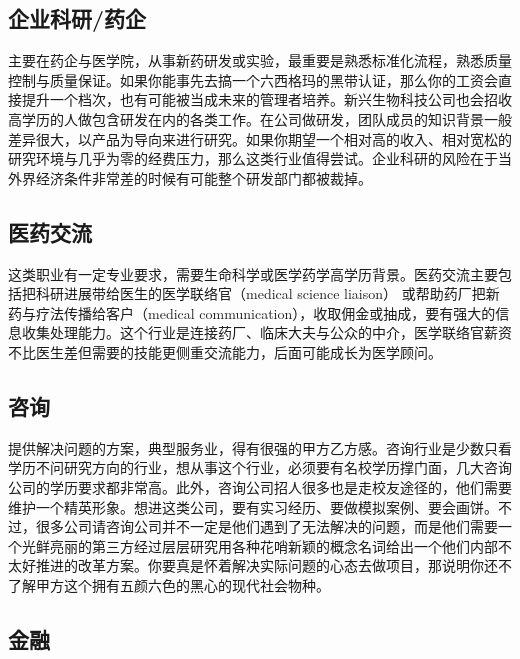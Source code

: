\documentclass[]{tufte-book}
\begin{document}
\hypertarget{ux4f01ux4e1aux79d1ux7814ux836fux4f01}{%
\subsection{企业科研/药企}\label{ux4f01ux4e1aux79d1ux7814ux836fux4f01}}

主要在药企与医学院，从事新药研发或实验，最重要是熟悉标准化流程，熟悉质量控制与质量保证。如果你能事先去搞一个六西格玛的黑带认证，那么你的工资会直接提升一个档次，也有可能被当成未来的管理者培养。新兴生物科技公司也会招收高学历的人做包含研发在内的各类工作。在公司做研发，团队成员的知识背景一般差异很大，以产品为导向来进行研究。如果你期望一个相对高的收入、相对宽松的研究环境与几乎为零的经费压力，那么这类行业值得尝试。企业科研的风险在于当外界经济条件非常差的时候有可能整个研发部门都被裁掉。

\hypertarget{ux533bux836fux4ea4ux6d41}{%
\subsection{医药交流}\label{ux533bux836fux4ea4ux6d41}}

这类职业有一定专业要求，需要生命科学或医学药学高学历背景。医药交流主要包括把科研进展带给医生的医学联络官（medical science liaison）
或帮助药厂把新药与疗法传播给客户（medical communication），收取佣金或抽成，要有强大的信息收集处理能力。这个行业是连接药厂、临床大夫与公众的中介，医学联络官薪资不比医生差但需要的技能更侧重交流能力，后面可能成长为医学顾问。

\hypertarget{ux54a8ux8be2}{%
\subsection{咨询}\label{ux54a8ux8be2}}

提供解决问题的方案，典型服务业，得有很强的甲方乙方感。咨询行业是少数只看学历不问研究方向的行业，想从事这个行业，必须要有名校学历撑门面，几大咨询公司的学历要求都非常高。此外，咨询公司招人很多也是走校友途径的，他们需要维护一个精英形象。想进这类公司，要有实习经历、要做模拟案例、要会画饼。不过，很多公司请咨询公司并不一定是他们遇到了无法解决的问题，而是他们需要一个光鲜亮丽的第三方经过层层研究用各种花哨新颖的概念名词给出一个他们内部不太好推进的改革方案。你要真是怀着解决实际问题的心态去做项目，那说明你还不了解甲方这个拥有五颜六色的黑心的现代社会物种。

\hypertarget{ux91d1ux878d}{%
\subsection{金融}\label{ux91d1ux878d}}
\end{document}
